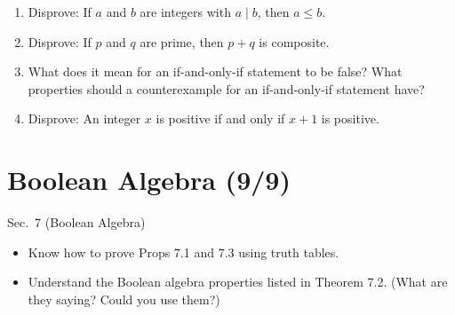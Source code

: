 \documentclass[11pt]{article}
\begin{document}
\begin{enumerate}
\item Disprove: If $a$ and $b$ are integers with $a \mid b$, then $a \leq b$.
\item Disprove: If $p$ and $q$ are prime, then $p+q$ is composite.
\item What does it mean for an if-and-only-if statement to be false? What properties should a counterexample for an if-and-only-if statement have?
\item Disprove: An integer $x$ is positive if and only if $x+1$ is positive.
\end{enumerate}

\section*{Boolean Algebra (9/9)}
\begin{textbook}{Sec.~7 (Boolean Algebra)}
\begin{itemize}[leftmargin=*, nosep]
\item Know how to prove Props 7.1 and 7.3 using truth tables.
\item Understand the Boolean algebra properties listed in Theorem 7.2. (What are they saying? Could you use them?)
\end{itemize}
\end{textbook}
\end{document}
